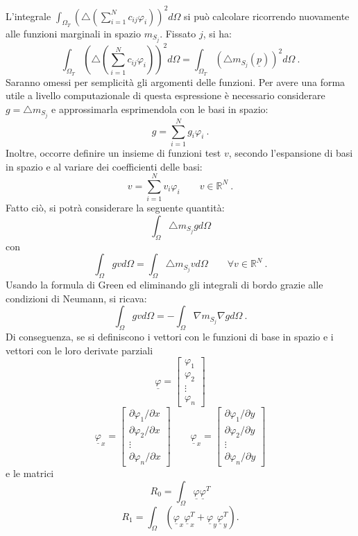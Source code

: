 \documentclass[a4paper,11pt,twoside,openright]{book}							%
\begin{document}
L'integrale $\int_{\Omega_T} ( \triangle(\sum_{i=1}^N  c_{ij}\varphi_i ) )^2 d \Omega$ si può calcolare  ricorrendo nuovamente alle funzioni marginali in spazio $m_{S_j}$. Fissato $j$, si ha:
$$
\int_{\Omega_T} ( \triangle(\sum_{i=1}^N  c_{ij}\varphi_i ) )^2 d \Omega = \int_{\Omega_T} (\triangle m_{S_j}(\underline p))^2 d \Omega \ .
$$
Saranno omessi per semplicità gli argomenti delle funzioni. Per avere una forma utile a livello computazionale di questa espressione è necessario considerare $ g = \triangle m_{S_j} $ e approssimarla esprimendola con le basi in spazio:
$$
g=\sum_{i=1}^N  g_i\varphi_i \ .
$$
Inoltre, occorre definire un insieme di funzioni test $v$, secondo l'espansione di basi in spazio e al variare dei coefficienti delle basi:
$$
v=\sum_{i=1}^N  v_i\varphi_i \qquad v \in \mathbb{R}^N \ .
$$
Fatto ciò, si potrà considerare la seguente quantità:
$$
\int_\Omega \triangle m_{S_j} g d \Omega
$$
con
$$
\int_\Omega g v d \Omega= \int_\Omega \triangle m_{S_j} v d \Omega\qquad \forall v \in \mathbb{R}^N \ .
$$
Usando la formula di Green ed eliminando gli integrali di bordo grazie alle condizioni di Neumann, si ricava:
$$
\int_\Omega g v d \Omega= -\int_\Omega \nabla m_{S_j} \nabla g d \Omega \ .
$$
Di conseguenza, se si definiscono i vettori con le funzioni di base in spazio e i vettori con le loro derivate parziali
$$
\underline \varphi =
\begin{bmatrix}
\varphi_{1}  \\
\varphi_{2}  \\
\vdots\\
\varphi_{n}
\end{bmatrix}
$$
\begin{equation}
\underline \varphi_x=  \begin{bmatrix}
\partial \varphi_{1}/\partial x \\
\partial \varphi_{2}/\partial x  \\
\vdots\\
\partial \varphi_{n}/\partial x \end{bmatrix} 
\qquad
\underline \varphi_x=  \begin{bmatrix}
\partial \varphi_{1}/\partial y  \\
\partial \varphi_{2}/\partial y  \\
\vdots\\
\partial \varphi_{n}/\partial y\end{bmatrix} 
\end{equation}
e le matrici
$$ R_0 = \int_\Omega \underline \varphi \underline \varphi^T $$
$$ R_1 = \int_\Omega (\underline \varphi_x \underline \varphi_x^T + \underline \varphi_y \underline \varphi_y^T). $$
\end{document}
